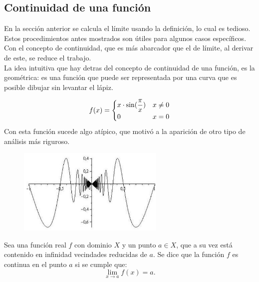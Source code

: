 \documentclass[10pt,twoside]{SelfArx} %
\begin{document}





\subsection{Continuidad de una funci\'on}

En la secci\'on anterior se calcula el límite usando la definición, lo cual es tedioso. Estos procedimientos antes mostrados son útiles para algunos casos específicos. Con el concepto de continuidad, que es más abarcador que el de límite, al derivar de este, se reduce el trabajo.\\
La idea intuitiva que hay detras del concepto de continuidad de una funci\'on, es la geométrica: es una función que puede ser representada por una curva que es posible dibujar sin levantar el lápiz.



\[ f(x)=\begin{cases}
x\cdot\sin(\dfrac{\pi}{x}) & \mbox{$ x\neq0 $}\\
0 & \mbox{$ x=0 $}
\end{cases} \]
Con esta funci\'on sucede algo atípico, que motivó a la aparición de otro tipo de análisis más riguroso.\\
\begin{figure}[h]
	\centering
	\includegraphics[width=7cm]{xsin_pix}
	\caption{}
	\label{xsin_pix}
\end{figure}

\begin{thm}\label{Continuidad_definicion_secilla}
	Sea una función real $ f $ con dominio $ X $ y un punto $ a\in X $, que a su vez está contenido en infinidad vecindades reducidas de $ a $. Se dice que la función $ f $ es continua en el punto $ a $ si se cumple que:
	\[ \lim\limits_{x\rightarrow a}f(x)=a. \]
\end{thm}
\end{document}
